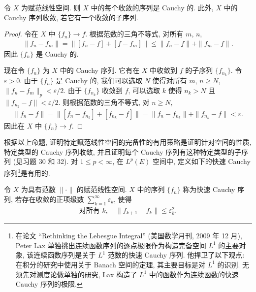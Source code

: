\documentclass[../../main.tex]{subfiles}
\begin{document}
\begin{proposition}\label{proposition:ch07-收敛序列Cauchy}
令 $X$ 为赋范线性空间. 则 $X$ 中的每个收敛的序列是 Cauchy 的. 此外, $X$ 中的 Cauchy 序列收敛, 若它有一个收敛的子序列.
\end{proposition}

\begin{proof}
令在 $X$ 中 $\{f_{n}\}\to f$. 根据范数的三角不等式, 对所有 $m$, $n$,
\begin{align*}
\|f_{n}-f_{m}\|=\|[f_{n}-f]+[f-f_{m}]\|\leqslant\|f_{n}-f\|+\|f_{m}-f\|.
\end{align*}
因此 $\{f_{n}\}$ 是 Cauchy 的.

现在令 $\{f_{n}\}$ 为 $X$ 中的 Cauchy 序列. 它有在 $X$ 中收敛到 $f$ 的子序列 $\{f_{n_{k}}\}$. 令 $\varepsilon>0$. 由于 $\{f_{n}\}$ 是 Cauchy 的, 我们可以选取 $N$ 使得对所有 $m$, $n\geqslant N$, $\|f_{n}-f_{m}\|_{p}<\varepsilon/2$. 由于 $\{f_{n_{k}}\}$ 收敛到 $f$, 可以选取 $k$ 使得 $n_{k}>N$ 且 $\|f_{n_{k}}-f\|<\varepsilon/2$. 则根据范数的三角不等式, 对 $n\geqslant N$,
\begin{align*}
\|f_{n}-f\|=\|[f_{n}-f_{n_{k}}]+[f_{n_{k}}-f]\|=\|f_{n}-f_{n_{k}}\|+\|f_{n_{k}}-f\|<\varepsilon.
\end{align*}
因此在 $X$ 中 $\{f_{n}\}\to f$.
\end{proof}

根据以上命题, 证明特定赋范线性空间的完备性的有用策略是证明针对空间的性质, 特定类型的 Cauchy 序列收敛, 并且证明每个 Cauchy 序列有这种特定类型的子序列 (见习题 30 和 32). 对 $1\leqslant p<\infty$, 在 $L^{p}(E)$ 空间中, 定义如下的快速 Cauchy 序列\footnote{在论文 ``Rethinking the Lebesgue Integral'' (美国数学月刊, 2009 年 12 月), Peter Lax 单独挑出连续函数序列的逐点极限作为构造完备空间 $L^{1}$ 的主要对象, 该连续函数序列是关于 $L^{1}$ 范数的快速 Cauchy 序列. 他捍卫了以下观点: 在积分的研究中使用关于 Banach 空间的定理, 其主要目标是对 $L^{1}$ 的识别. 无须先对测度论做单独的研究, Lax 构造了 $L^{1}$ 中的函数作为连续函数的快速 Cauchy 序列的极限.}是有用的.

\begin{definition}[快速 Cauchy 序列]\label{definition:ch07-快速Cauchy}
令 $X$ 为具有范数 $\|\cdot\|$ 的赋范线性空间. $X$ 中的序列 $\{f_{n}\}$ 称为快速 Cauchy 序列, 若存在收敛的正项级数 $\sum_{k=1}^{\infty}\varepsilon_{k}$, 使得
\begin{align*}
\text{对所有 }k,\quad\|f_{k+1}-f_{k}\|\leqslant\varepsilon_{k}^{2}.
\end{align*}
\end{definition}
\end{document}
